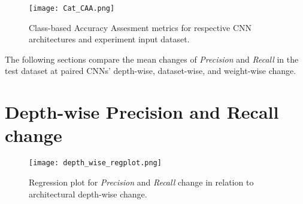 \documentclass[11pt, a4paper, twoside]{report}
\begin{document}
\begin{figure}[H]
  \centering
  \texttt{[image: Cat\_CAA.png]}
  \caption{Class-based Accuracy Assesment metrics for respective CNN architectures and experiment input dataset.}
  \label{fig:Cat_CAA}
\end{figure}

The following sections compare the mean changes of \textit{Precision} and \textit{Recall} in the test dataset at paired CNNs' depth-wise, dataset-wise, and weight-wise change.\\\par

\section{Depth-wise Precision and Recall change}

\begin{table}[H]
  \centering
  \label{table:depth-wise_change}
  \caption{Changes with architectures that had a depth-wise increased for each setup..}
\end{table}

\begin{figure}[H]
  \centering
  \texttt{[image: depth\_wise\_regplot.png]}
  \caption{Regression plot for \textit{Precision} and \textit{Recall} change in relation to architectural depth-wise change.}
  \label{fig:depth_regplot}
\end{figure}
\end{document}
